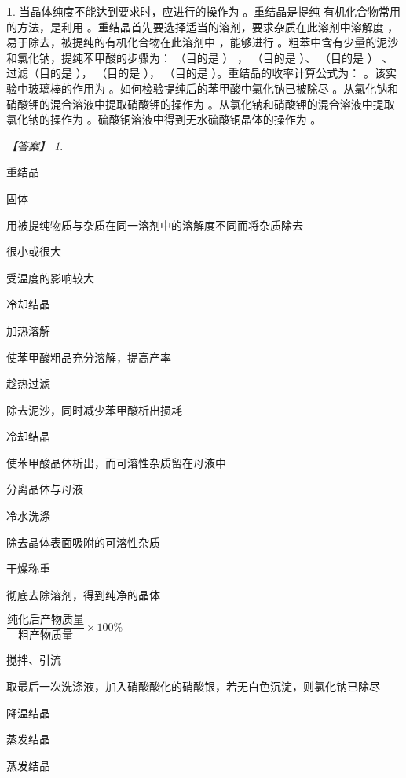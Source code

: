 \documentclass[UTF8, 10pt, a4paper, oneside]{ctexart}
\newcommand{\blank}{ \underbar{\quad$\blacktriangle$\quad} }%
\theoremstyle{definition}
\newtheorem{subexercise}{}[exercise]%
\theoremstyle{remark}
\newtheorem*{answer}{【答案】}
\theoremstyle{plain}
\begin{document}
\begin{subexercise}
    当晶体纯度不能达到要求时，应进行的操作为\blank 。重结晶是提纯\blank 有机化合物常用的方法，是利用\blank 。重结晶首先要选择适当的溶剂，要求杂质在此溶剂中溶解度\blank ，易于除去，被提纯的有机化合物在此溶剂中\blank ，能够进行\blank 。粗苯中含有少量的泥沙和氯化钠，提纯苯甲酸的步骤为：\blank （目的是\blank ） ，\blank （目的是\blank ）、\blank （目的是\blank ） 、过滤（目的是\blank ），\blank （目的是\blank ），\blank （目的是\blank ）。重结晶的收率计算公式为：\blank 。该实验中玻璃棒的作用为\blank 。如何检验提纯后的苯甲酸中氯化钠已被除尽\blank 。从氯化钠和硝酸钾的混合溶液中提取硝酸钾的操作为\blank 。从氯化钠和硝酸钾的混合溶液中提取氯化钠的操作为\blank 。硫酸铜溶液中得到无水硫酸铜晶体的操作为\blank 。
    \begin{answer}
        \begin{inparaenum}
            \item[\setcounter{enumi}{1}\textsuperscript{\arabic{enumi}}] 重结晶
            \item 固体
            \item 用被提纯物质与杂质在同一溶剂中的溶解度不同而将杂质除去
            \item 很小或很大
            \item 受温度的影响较大
            \item 冷却结晶
            \item 加热溶解
            \item 使苯甲酸粗品充分溶解，提高产率
            \item 趁热过滤
            \item 除去泥沙，同时减少苯甲酸析出损耗
            \item 冷却结晶
            \item 使苯甲酸晶体析出，而可溶性杂质留在母液中
            \item 分离晶体与母液
            \item 冷水洗涤\vspace{0.5em}\\
            \item 除去晶体表面吸附的可溶性杂质
            \item 干燥称重
            \item 彻底去除溶剂，得到纯净的晶体
            \item $\dfrac{\text{纯化后产物质量}}{\text{粗产物质量}}\times 100\%$\vspace{0.5em}\\
            \item 搅拌、引流
            \item 取最后一次洗涤液，加入硝酸酸化的硝酸银，若无白色沉淀，则氯化钠已除尽
            \item 降温结晶
            \item 蒸发结晶
            \item 蒸发结晶
        \end{inparaenum}
    \end{answer}
\end{subexercise}
\end{document}
